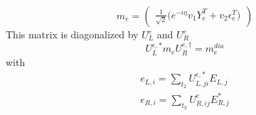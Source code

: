 \begin{itemize}
\begin{equation} 
m_{e} = \left( 
\begin{array}{c}
\frac{1}{\sqrt{2}} \Big(e^{-i \eta } v_1 Y_{e}^{T}  + v_2 \epsilon_{e}^{T} \Big)\end{array} 
\right) 
 \end{equation} 
This matrix is diagonalized by \(U^e_L\) and \(U^e_R\) 
\begin{equation} 
U^{e,*}_L m_{e} U_{R}^{e,\dagger} = m^{dia}_{e} 
\end{equation} 
with 
\begin{align} 
e_{L,{i}} = \sum_{t_2}U^{e,*}_{L,{j i}}E_{L,{j}}\\ 
e_{R,{i}} = \sum_{t_2}U_{R,{i j}}^{e}E^*_{R,{j}}
\end{align} 
\end{itemize} 
